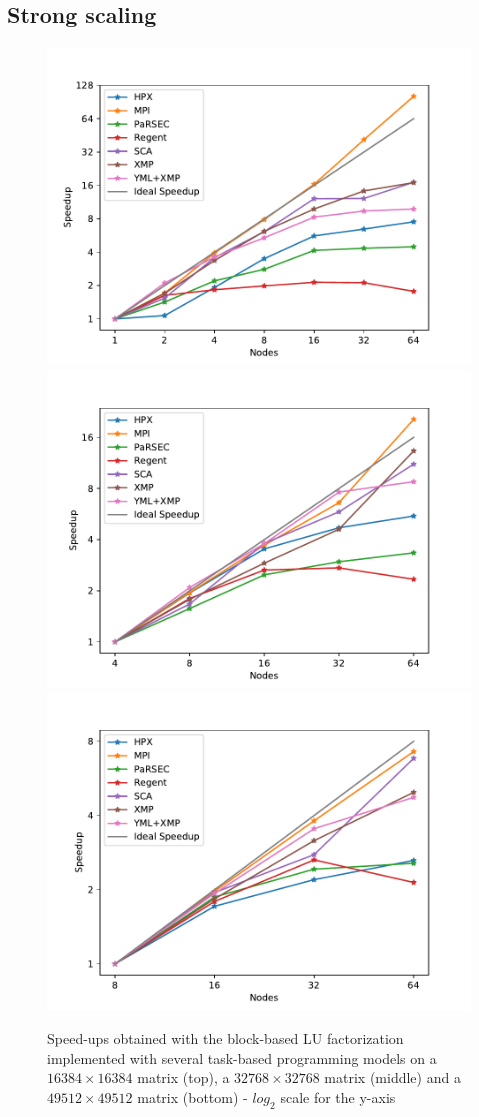 \subsection{Strong scaling}
\label{sec:strong_scaling}
\begin{figure}[h]
	\centering
	\includegraphics[width=.6\linewidth]{fig_strong_scaling_speedup_task}
	\includegraphics[width=.6\linewidth]{fig_strong_scaling_speedup_task_32k}
	\includegraphics[width=.6\linewidth]{fig_strong_scaling_speedup_task_49k}
	\caption{Speed-ups obtained with the block-based LU factorization implemented with several task-based programming models on a $16384 \times 16384$ matrix (top), a $32768 \times 32768$ matrix (middle) and a $49512 \times 49512$ matrix (bottom) - $log_2$ scale for the y-axis\label{fig:strong_scaling}}
\end{figure}

